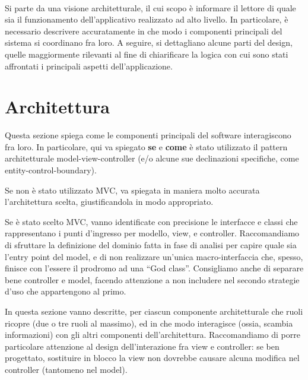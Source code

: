 \documentclass[a4paper,12pt]{report}
\begin{document}
\paragraph{}
\paragraph{}
\paragraph{}
\paragraph{}
Si parte da una visione architetturale, il cui scopo è informare il lettore di quale sia il funzionamento dell'applicativo realizzato ad alto livello.
%
In particolare, è necessario descrivere accuratamente in che modo i componenti principali del sistema si coordinano fra loro.
%
A seguire, si dettagliano alcune parti del design, quelle maggiormente rilevanti al fine di chiarificare la logica con cui sono stati affrontati i principali aspetti dell'applicazione.

\section{Architettura}

Questa sezione spiega come le componenti principali del software interagiscono fra loro.
%
In particolare, qui va spiegato \textbf{se} e \textbf{come} è stato utilizzato il pattern
architetturale model-view-controller (e/o alcune sue declinazioni specifiche, come entity-control-boundary).

Se non è stato utilizzato MVC, va spiegata in maniera molto accurata l'architettura scelta, giustificandola in modo appropriato.

Se è stato scelto MVC, vanno identificate con precisione le interfacce e classi che rappresentano i punti d'ingresso per modello, view, e controller.
Raccomandiamo di sfruttare la definizione del dominio fatta in fase di analisi per capire quale sia l'entry point del model, e di non realizzare un'unica macro-interfaccia che, spesso, finisce con l'essere il prodromo ad una ``God class''.
%
Consigliamo anche di separare bene controller e model, facendo attenzione a non includere nel secondo strategie d'uso che appartengono al primo.

In questa sezione vanno descritte, per ciascun componente architetturale che ruoli ricopre (due o tre ruoli al massimo), ed in che modo interagisce (ossia, scambia informazioni) con gli altri componenti dell'architettura.
%
Raccomandiamo di porre particolare attenzione al design dell'interazione fra view e controller: se ben progettato, sostituire in blocco la view non dovrebbe causare alcuna modifica nel controller (tantomeno nel model).
\end{document}

